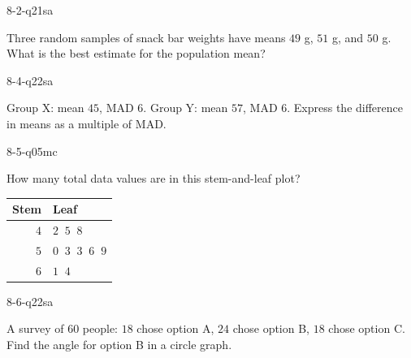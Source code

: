 \begin{practiceQuestion}{8-2-q21}{sa}
\begin{questionText}
Three random samples of snack bar weights have means $49$ g, $51$ g, and $50$ g. What is the best estimate for the population mean?
\end{questionText}
\end{practiceQuestion}

\begin{practiceQuestion}{8-4-q22}{sa}
\begin{questionText}
Group X: mean $45$, MAD $6$. Group Y: mean $57$, MAD $6$. Express the difference in means as a multiple of MAD.
\end{questionText}
\end{practiceQuestion}

\begin{practiceQuestion}{8-5-q05}{mc}
\begin{questionText}
How many total data values are in this stem-and-leaf plot?

\begin{center}
\begin{tabular}{r|l}
\textbf{Stem} & \textbf{Leaf} \\
\hline
$4$ & $2\;\;5\;\;8$ \\
$5$ & $0\;\;3\;\;3\;\;6\;\;9$ \\
$6$ & $1\;\;4$
\end{tabular}
\end{center}
\end{questionText}
\end{practiceQuestion}

\begin{practiceQuestion}{8-6-q22}{sa}
\begin{questionText}
A survey of $60$ people: $18$ chose option A, $24$ chose option B, $18$ chose option C. Find the angle for option B in a circle graph.
\end{questionText}
\end{practiceQuestion}

